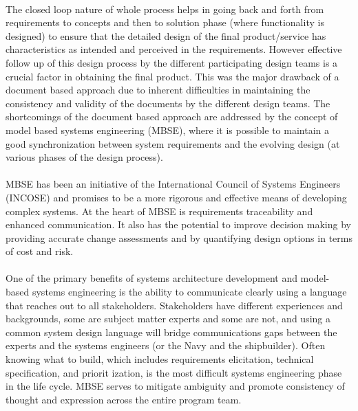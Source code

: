 \documentclass[a4paper,12pt,twoside]{report}
\begin{document}
{			\paragraph{} {\cite{IntegratedApproachMBMechatronicDesign}}
			
			\paragraph{} {The closed loop nature of whole process helps in going back and forth from requirements to concepts and then to solution phase (where functionality is designed) to ensure that the detailed design of the final product/service has characteristics as intended and perceived in the requirements. However effective follow up of this design process by the different participating design teams is a crucial factor in obtaining the final product. This was the major drawback of a document based  approach due to inherent difficulties in maintaining the consistency and validity of the documents by the different design teams. The shortcomings of the document based approach are addressed by the concept of model based systems engineering (MBSE), where it is possible to maintain a good synchronization between system requirements and the evolving design (at various phases of the design process). \cite{ModelBasedBMechatronisSysMLMatlab}
			}
			
			\paragraph{} {MBSE has been an initiative of the International Council of Systems Engineers (INCOSE) and promises to be a more rigorous and effective means of developing complex systems. At the heart of MBSE is requirements traceability and enhanced communication. It also has the potential to improve decision making by providing accurate change assessments and by quantifying design options in terms of cost and risk. \cite{MBSESystemArchitectureNavalShipDesign}
			}
			
			\paragraph{} {One of the primary benefits of systems architecture development and model-based systems engineering is the ability to communicate clearly using a language that reaches out to all stakeholders. Stakeholders have different experiences and backgrounds, some are subject matter experts and some are not, and using a common system design language will bridge communications gaps between the experts and the systems engineers (or the Navy and the shipbuilder). Often knowing what to build, which includes requirements elicitation, technical specification, and priorit ization, is the most difficult systems engineering phase in the life cycle. MBSE serves to mitigate ambiguity and promote consistency of thought and expression across the entire program team. \cite{MBSESystemArchitectureNavalShipDesign}
			}
									
}
\end{document}
